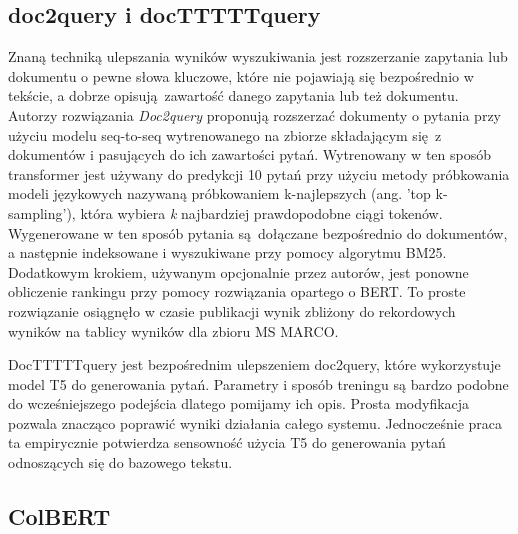 \subsection{doc2query i docTTTTTquery}

Znaną techniką ulepszania wyników wyszukiwania jest rozszerzanie zapytania lub dokumentu o pewne słowa kluczowe, które nie pojawiają się bezpośrednio w tekście, a dobrze opisują zawartość danego zapytania lub też dokumentu. Autorzy rozwiązania \emph{Doc2query} proponują rozszerzać dokumenty o pytania przy użyciu modelu seq-to-seq wytrenowanego na zbiorze składającym się z dokumentów i pasujących do ich zawartości pytań. Wytrenowany w ten sposób transformer jest używany do predykcji 10 pytań przy użyciu metody próbkowania modeli językowych nazywaną próbkowaniem k-najlepszych (ang. 'top k-sampling'), która wybiera \emph{k} najbardziej prawdopodobne ciągi tokenów. Wygenerowane w ten sposób pytania są dołączane bezpośrednio do dokumentów, a następnie indeksowane i wyszukiwane przy pomocy algorytmu BM25. Dodatkowym krokiem, używanym opcjonalnie przez autorów, jest ponowne obliczenie rankingu przy pomocy rozwiązania opartego o BERT. To proste rozwiązanie osiągnęło w czasie publikacji wynik zbliżony do rekordowych wyników na tablicy wyników dla zbioru MS MARCO.  \autocite{nogueira2019document} \newline

DocTTTTTquery jest bezpośrednim ulepszeniem doc2query, które wykorzystuje model T5 do generowania pytań. Parametry i sposób treningu są bardzo podobne do wcześniejszego podejścia dlatego pomijamy ich opis. \autocite{nogueira2019doc2query} Prosta modyfikacja pozwala znacząco poprawić wyniki działania całego systemu. Jednocześnie praca ta empirycznie potwierdza sensowność użycia T5 do generowania pytań odnoszących się do bazowego tekstu.  


\subsection{ColBERT}

